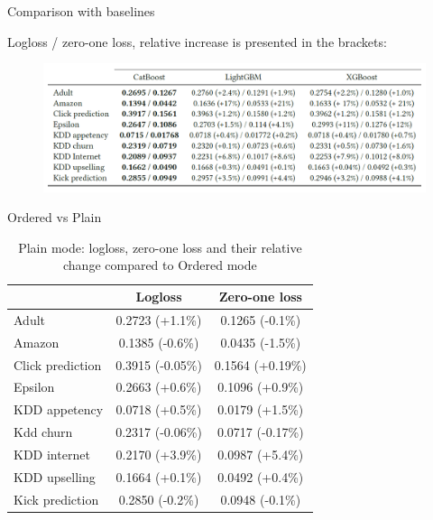 \documentclass[pdf, 12pt, unicode]{beamer}
\newcommand{\1}{\mathbbm{1}}
\begin{document}
\begin{frame}{Comparison with baselines}

Logloss / zero-one loss, relative increase is presented in the brackets:

	\begin{figure}
		\centering
		\includegraphics[width=\textwidth]{baselines.png}
	\end{figure}

\end{frame}

\begin{frame}{Ordered vs Plain}
\begin{small}
	\begin{table}
		\caption{Plain mode: logloss, zero-one loss and their relative change compared to Ordered mode}\label{tab:plain}
		\centering
		\begin{tabular}{l|cc}
			& Logloss &  Zero-one loss \\
			\hline
			Adult & 
			0.2723 (+1.1\%) &
			0.1265	(-0.1\%) \\
			Amazon & 
			0.1385 (-0.6\%) & 
			0.0435	(-1.5\%) \\	
			Click prediction & 
			0.3915	(-0.05\%) & 
			0.1564	(+0.19\%) \\
			Epsilon & 
			0.2663 (+0.6\%) & 
			0.1096 (+0.9\%) \\
			KDD appetency & 
			0.0718	(+0.5\%) & 
			0.0179	(+1.5\%) \\
			Kdd churn & 
			0.2317	(-0.06\%) & 
			0.0717	(-0.17\%)  \\
			KDD internet & 
			0.2170 (+3.9\%) & 
			0.0987 (+5.4\%) \\
			KDD upselling & 
			0.1664 (+0.1\%) & 
			0.0492 (+0.4\%) \\
			Kick prediction & 
			0.2850 (-0.2\%) & 
			0.0948 (-0.1\%) \\
		\end{tabular}
	\end{table}
\end{small}

\end{frame}
\end{document}
